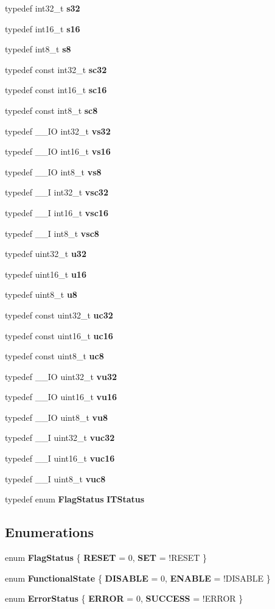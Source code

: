 \begin{DoxyCompactItemize}
\item 
typedef int32\+\_\+t \textbf{ s32}
\item 
typedef int16\+\_\+t \textbf{ s16}
\item 
typedef int8\+\_\+t \textbf{ s8}
\item 
typedef const int32\+\_\+t \textbf{ sc32}
\item 
typedef const int16\+\_\+t \textbf{ sc16}
\item 
typedef const int8\+\_\+t \textbf{ sc8}
\item 
typedef \+\_\+\+\_\+\+IO int32\+\_\+t \textbf{ vs32}
\item 
typedef \+\_\+\+\_\+\+IO int16\+\_\+t \textbf{ vs16}
\item 
typedef \+\_\+\+\_\+\+IO int8\+\_\+t \textbf{ vs8}
\item 
typedef \+\_\+\+\_\+I int32\+\_\+t \textbf{ vsc32}
\item 
typedef \+\_\+\+\_\+I int16\+\_\+t \textbf{ vsc16}
\item 
typedef \+\_\+\+\_\+I int8\+\_\+t \textbf{ vsc8}
\item 
typedef uint32\+\_\+t \textbf{ u32}
\item 
typedef uint16\+\_\+t \textbf{ u16}
\item 
typedef uint8\+\_\+t \textbf{ u8}
\item 
typedef const uint32\+\_\+t \textbf{ uc32}
\item 
typedef const uint16\+\_\+t \textbf{ uc16}
\item 
typedef const uint8\+\_\+t \textbf{ uc8}
\item 
typedef \+\_\+\+\_\+\+IO uint32\+\_\+t \textbf{ vu32}
\item 
typedef \+\_\+\+\_\+\+IO uint16\+\_\+t \textbf{ vu16}
\item 
typedef \+\_\+\+\_\+\+IO uint8\+\_\+t \textbf{ vu8}
\item 
typedef \+\_\+\+\_\+I uint32\+\_\+t \textbf{ vuc32}
\item 
typedef \+\_\+\+\_\+I uint16\+\_\+t \textbf{ vuc16}
\item 
typedef \+\_\+\+\_\+I uint8\+\_\+t \textbf{ vuc8}
\item 
typedef enum \textbf{ Flag\+Status} \textbf{ I\+T\+Status}
\end{DoxyCompactItemize}
\subsection*{Enumerations}
\begin{DoxyCompactItemize}
\item 
enum \textbf{ Flag\+Status} \{ \textbf{ R\+E\+S\+ET} = 0, 
\textbf{ S\+ET} = !\+R\+E\+S\+ET
 \}
\item 
enum \textbf{ Functional\+State} \{ \textbf{ D\+I\+S\+A\+B\+LE} = 0, 
\textbf{ E\+N\+A\+B\+LE} = !\+D\+I\+S\+A\+B\+LE
 \}
\item 
enum \textbf{ Error\+Status} \{ \textbf{ E\+R\+R\+OR} = 0, 
\textbf{ S\+U\+C\+C\+E\+SS} = !\+E\+R\+R\+OR
 \}
\end{DoxyCompactItemize}


